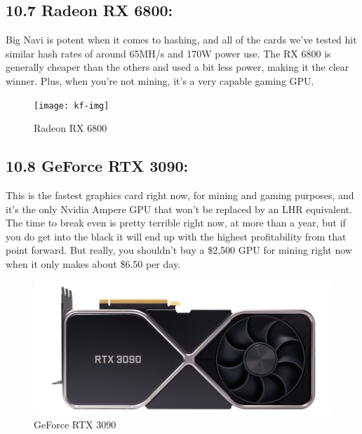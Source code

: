 \subsection*{10.7 Radeon RX 6800:} Big Navi is potent when it comes to hashing, and all of the cards we've tested hit similar hash rates of around 65MH/s and 170W power use. The RX 6800 is generally cheaper than the others and used a bit less power, making it the clear winner. Plus, when you're not mining, it's a very capable gaming GPU.

\begin{figure}[h]
	\centering
	\texttt{[image: kf-img]}
	\captionsetup{labelformat=empty}
	\caption{Radeon RX 6800}
\end{figure}

\subsection*{10.8 GeForce RTX 3090:} This is the fastest graphics card right now, for mining and gaming purposes, and it's the only Nvidia Ampere GPU that won't be replaced by an LHR equivalent. The time to break even is pretty terrible right now, at more than a year, but if you do get into the black it will end up with the highest profitability from that point forward. But really, you shouldn't buy a \$2,500 GPU for mining right now when it only makes about \$6.50 per day.

\begin{figure}[h]
	\centering
	\includegraphics[width=0.7\linewidth]{images/geforce_rtx_3090_fe}
	\captionsetup{labelformat=empty}
	\caption{GeForce RTX 3090}
\end{figure}
